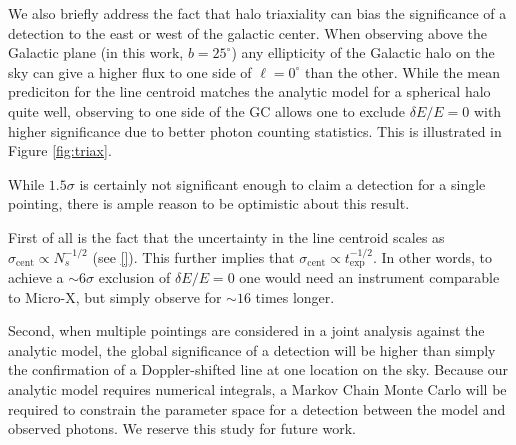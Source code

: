 \documentclass[aps,prl,10pt,twocolumn,superscriptaddress,showpacs]{revtex4-1}
\begin{document}
We also briefly address the fact that halo triaxiality can bias the significance of a detection to
the east or west of the galactic center. When observing above the Galactic plane (in this work,
$b=25^\circ$) any ellipticity of the Galactic halo on the sky can give a higher flux to one side of
$\ell=0^\circ$ than the other. While the mean prediciton for the line centroid matches the analytic model
for a spherical halo quite well, observing to one side of the GC allows one to exclude $\delta
E/E=0$ with higher significance due to better photon counting statistics. This is illustrated in Figure \ref{fig:triax}.





While $1.5\sigma$ is certainly not significant enough to claim a detection for a single pointing, there is ample reason to
be optimistic about this result. 

First of all is the fact that the uncertainty in the line centroid
scales as $\sigma_{\mathrm{cent}} \propto N_s^{-1/2}$ (see \eqref{}). This further implies that
$\sigma_{\mathrm{cent}} \propto t_\mathrm{exp}^{-1/2}$. In other words, to achieve a $\sim 6\sigma$
exclusion of $\delta E/E=0$ one would need an instrument comparable to Micro-X, but simply observe
for $\sim 16$ times longer. 

Second, when multiple pointings are considered in a joint analysis against the analytic model, the
global significance of a detection will be higher than simply the confirmation of a Doppler-shifted
line at one location on the sky. Because our analytic model requires numerical integrals, a Markov
Chain Monte Carlo will be required to constrain the parameter space for a detection between the
model and observed photons. We reserve this study for future work.
\end{document}
